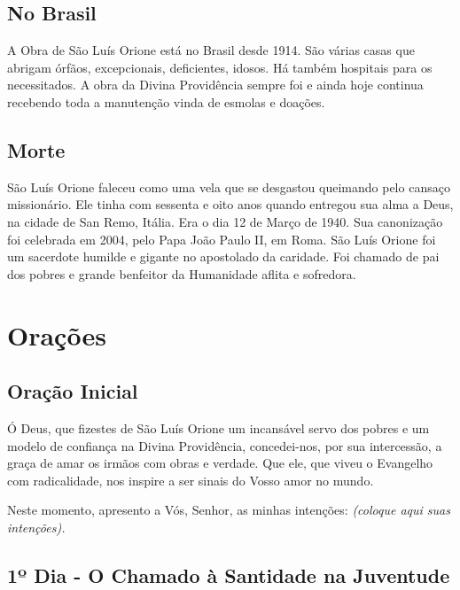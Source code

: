\documentclass[a4paper,14pt]{extarticle} \usepackage[utf8]{inputenc}
\begin{document}
\subsection{No Brasil}

A Obra de São Luís Orione está no Brasil desde 1914. São várias casas que abrigam órfãos, excepcionais, deficientes, idosos. Há também hospitais para os necessitados. A obra da Divina Providência sempre foi e ainda hoje continua recebendo toda a manutenção vinda de esmolas e doações. 

\subsection{Morte}

São Luís Orione faleceu como uma vela que se desgastou queimando pelo cansaço missionário. Ele tinha com sessenta e oito anos quando entregou sua alma a Deus, na cidade de San Remo, Itália. Era o dia 12 de Março de 1940. Sua canonização foi celebrada em 2004, pelo Papa João Paulo II, em Roma. São Luís Orione foi um sacerdote humilde e gigante no apostolado da caridade. Foi chamado de pai dos pobres e grande benfeitor da Humanidade aflita e sofredora.

\newpage

\vfill

\section{Orações}
\subsection{Oração Inicial}\label{sub:inicial} %

Ó Deus, que fizestes de São Luís Orione um incansável servo dos pobres e um modelo de confiança na Divina Providência, concedei-nos, por sua intercessão, a graça de amar os irmãos com obras e verdade. Que ele, que viveu o Evangelho com radicalidade, nos inspire a ser sinais do Vosso amor no mundo.

Neste momento, apresento a Vós, Senhor, as minhas intenções:
\textit{(coloque aqui suas intenções).}


\subsection{1º Dia - O Chamado à Santidade na Juventude}

\underline{}
\end{document}
